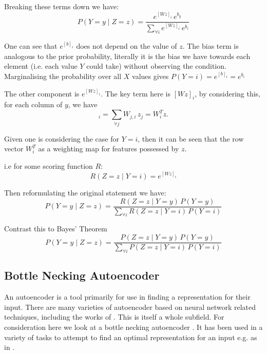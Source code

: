 \documentclass[12pt,parskip]{komatufte}
\begin{document}
Breaking these terms down we have:
\begin{equation}
P(Y=y\mid Z=z)=\frac{e^{[Wz]_{i}}\,e^{b_{y}}}{\sum_{\forall i}e^{[Wz]_{i}}\,e^{b_{i}}}
\end{equation}

One can see that $e^{[b]_{i}}$ does not depend on the value of $z$.
The bias term is analogous to the prior probability, literally it is the bias we have towards each element (i.e. each value $Y$ could take) without observing the condition.
Marginalising the probability over all $X$ values gives $P(Y=i)=e^{[b]_{i}}=e^{b_{i}}$


The other component is $e^{[Wz]_{i}}$.
The key term here is $[Wz]_{i}$, by considering this, for each column of $y$,
we have 
\begin{equation}
[Wz]_{i}=\sum_{\forall j}W_{j,i}\,z_{j}=W_{i}^{T}z.
\end{equation}

Given one is considering the case for $Y=i$, then 
it can be seen that the row vector $W_{i}^{T}$ as a weighting map for features possessed by $z$.

i.e for some scoring function $R$:
\begin{equation}
R(Z=z\mid Y=i)=e^{[Wz]_{i}}
\end{equation}


Then reformulating the original statement we have:
\begin{equation}
P(Y=y\mid Z=z)=\frac{R(Z=z\mid Y=y)\,P(Y=y)}{\sum_{\forall i}R(Z=z\mid Y=i)\,P(Y=i)}
\end{equation}

Contrast this to Bayes' Theorem
\begin{equation}
P(Y=y\mid Z=z)=\frac{P(Z=z\mid Y=y)\,P(Y=y)}{\sum_{\forall i}P(Z=z\mid Y=i)\,P(Y=i)}
\end{equation}



\subsection{Bottle Necking Autoencoder}
An autoencoder is a tool primarily for use in finding a representation for their input.
There are many varieties of autoencoder based on neural network related techniques, including the works of \textcite{hinton2002RBM,hinton2006reducing,hinton2006fastDBN,vincent2010stacked,ICML2012Chen_416,2014VAE}.
This is itself a whole subfield.
For consideration here we look at a bottle necking autoencoder
\parencite{bourlard1988auto,japkowicz2000nonlinear}.
It has been used in a variety of tasks to attempt to find an optimal representation for an input e.g. as in .
\end{document}
